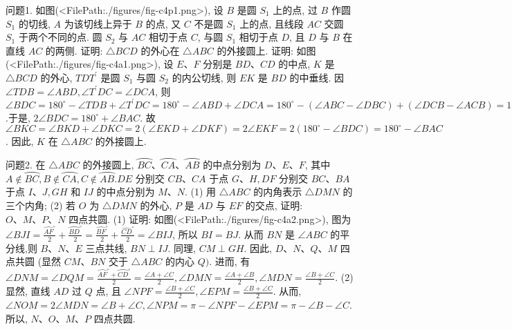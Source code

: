 
问题1. 如图(<FilePath:./figures/fig-c4p1.png>), 设 $B$ 是圆 $S_1$ 上的点, 过 $B$ 作圆 $S_1$ 的切线, $A$ 为该切线上异于 $B$ 的点, 又 $C$ 不是圆 $S_1$ 上的点, 且线段 $A C$ 交圆 $S_1$ 于两个不同的点.
圆 $S_2$ 与 $A C$ 相切于点 $C$, 与圆 $S_1$ 相切于点 $D$, 且 $D$ 与 $B$ 在直线 $A C$ 的两侧.
证明: $\triangle B C D$ 的外心在 $\triangle A B C$ 的外接圆上.
证明: 如图(<FilePath:./figures/fig-c4a1.png>), 设 $E 、 F$ 分别是 $B D 、 C D$ 的中点, $K$ 是 $\triangle B C D$ 的外心, $T D T^{\prime}$ 是圆 $S_1$ 与圆 $S_2$ 的内公切线, 则 $E K$ 是 $B D$ 的中垂线.
因 $\angle T D B=\angle A B D, \angle T^{\prime} D C=\angle D C A$, 则 $\angle B D C=180^{\circ}-\angle T D B+\angle T^{\prime} D C=180^{\circ}- \angle A B D+\angle D C A=180^{\circ}-(\angle A B C-\angle D B C)+ (\angle D C B-\angle A C B)=180^{\circ}-\angle A B C-\angle A C B+ \angle D B C+\angle D C B=\angle B A C+180^{\circ}-\angle B D C$.于是, $2 \angle B D C=180^{\circ}+\angle B A C$. 故 $\angle B K C= \angle B K D+\angle D K C=2(\angle E K D+\angle D K F)=2 \angle E K F=2\left(180^{\circ}-\angle B D C\right)=180^{\circ}-\angle B A C$. 因此, $K$ 在 $\triangle A B C$ 的外接圆上.



问题2. 在 $\triangle A B C$ 的外接圆上, $\overparen{B C} 、 \overparen{C A} 、 \overparen{A B}$ 的中点分别为 $D 、 E 、 F$, 其中 $A \notin \overparen{B C}, B \notin \overparen{C A}, C \notin \overparen{A B} . D E$ 分别交 $C B 、 C A$ 于点 $G 、 H, D F$ 分别交 $B C 、 B A$ 于点 $I 、 J, G H$ 和 $I J$ 的中点分别为 $M 、 N$.
(1) 用 $\triangle A B C$ 的内角表示 $\triangle D M N$ 的三个内角;
(2) 若 $O$ 为 $\triangle D M N$ 的外心, $P$ 是 $A D$ 与 $E F$ 的交点, 证明: $O 、 M 、 P 、 N$ 四点共圆.
(1) 证明: 如图(<FilePath:./figures/fig-c4a2.png>), 图为 $\angle B J I=\frac{\overparen{A F}^{\circ}}{2}+\frac{\overparen{B D}^{\circ}}{2}=\frac{\overparen{B F}^{\circ}}{2}+ \frac{\widehat{C D}^{\circ}}{2}=\angle B I J$, 所以 $B I=B J$. 从而 $B N$ 是 $\angle A B C$ 的平分线,则 $B 、 N 、 E$ 三点共线, $B N \perp I J$. 同理, $C M \perp G H$. 因此, $D 、 N 、 Q 、 M$ 四点共圆 (显然 $C M 、 B N$ 交于 $\triangle A B C$ 的内心 $Q)$. 进而, 有 $\angle D N M=\angle D Q M=\frac{\overparen{A F}^{\circ}+\overparen{C D}^{\circ}}{2}=\frac{\angle A+\angle C}{2}, \angle D M N=\frac{\angle A+\angle B}{2}, \angle M D N=\frac{\angle B+\angle C}{2}$.
(2) 显然, 直线 $A D$ 过 $Q$ 点, 且 $\angle N P F=\frac{\angle B+\angle C}{2}, \angle E P M= \frac{\angle B+\angle C}{2}$. 从而, $\angle N O M=2 \angle M D N=\angle B+\angle C, \angle N P M=\pi- \angle N P F-\angle E P M=\pi-\angle B-\angle C$.
所以, $N 、 O 、 M 、 P$ 四点共圆.




